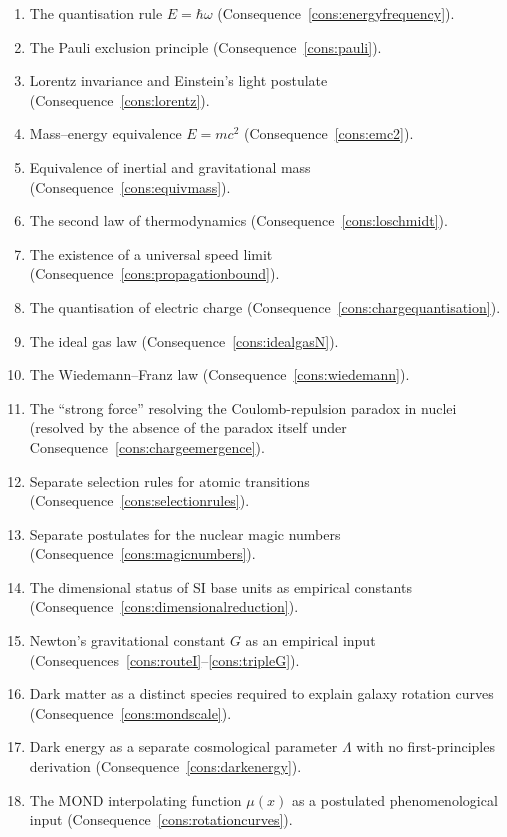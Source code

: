 \begin{enumerate}
  \item The quantisation rule $E=\hbar\omega$ (Consequence~\ref{cons:energyfrequency}).
  \item The Pauli exclusion principle (Consequence~\ref{cons:pauli}).
  \item Lorentz invariance and Einstein's light postulate
    (Consequence~\ref{cons:lorentz}).
  \item Mass--energy equivalence $E=mc^{2}$ (Consequence~\ref{cons:emc2}).
  \item Equivalence of inertial and gravitational mass
    (Consequence~\ref{cons:equivmass}).
  \item The second law of thermodynamics (Consequence~\ref{cons:loschmidt}).
  \item The existence of a universal speed limit
    (Consequence~\ref{cons:propagationbound}).
  \item The quantisation of electric charge
    (Consequence~\ref{cons:chargequantisation}).
  \item The ideal gas law (Consequence~\ref{cons:idealgasN}).
  \item The Wiedemann--Franz law (Consequence~\ref{cons:wiedemann}).
  \item The ``strong force'' resolving the Coulomb-repulsion paradox in
    nuclei (resolved by the absence of the paradox itself under
    Consequence~\ref{cons:chargeemergence}).
  \item Separate selection rules for atomic transitions
    (Consequence~\ref{cons:selectionrules}).
  \item Separate postulates for the nuclear magic numbers
    (Consequence~\ref{cons:magicnumbers}).
  \item The dimensional status of SI base units as empirical constants
    (Consequence~\ref{cons:dimensionalreduction}).
  \item Newton's gravitational constant $G$ as an empirical input
    (Consequences~\ref{cons:routeI}--\ref{cons:tripleG}).
  \item Dark matter as a distinct species required to explain galaxy rotation
    curves (Consequence~\ref{cons:mondscale}).
  \item Dark energy as a separate cosmological parameter $\Lambda$ with no
    first-principles derivation (Consequence~\ref{cons:darkenergy}).
  \item The MOND interpolating function $\mu(x)$ as a postulated
    phenomenological input (Consequence~\ref{cons:rotationcurves}).
\end{enumerate}

